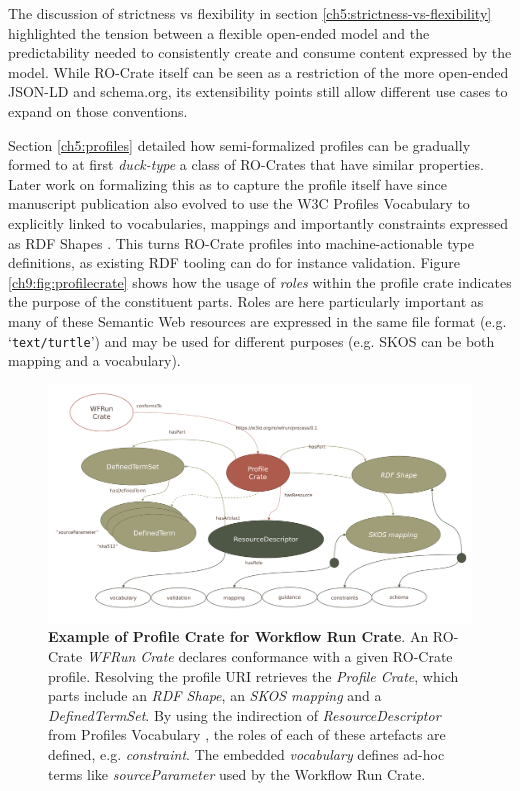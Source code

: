 The discussion of strictness vs flexibility in section \vref{ch5:strictness-vs-flexibility} highlighted the tension between a  flexible open-ended model and the predictability needed to consistently create and consume content expressed by the model. While RO-Crate itself can be seen as a restriction of the more open-ended JSON-LD and schema.org, its extensibility points still allow different use cases to expand on those conventions.  

Section \vref{ch5:profiles} detailed how semi-formalized profiles can be gradually formed to at first \emph{duck-type} a class of RO-Crates that have similar properties. Later work on formalizing this as  to capture the profile itself have since manuscript publication also evolved to use the W3C Profiles Vocabulary \cite{dx-prof} to explicitly linked to vocabularies, mappings and importantly constraints expressed as RDF Shapes \cite{fdo-collections}. This turns RO-Crate profiles into machine-actionable type definitions, as existing RDF tooling can do for instance validation. Figure \vref{ch9:fig:profilecrate} shows how the usage of \emph{roles} within the profile crate indicates the purpose of the constituent parts. Roles are here particularly important as many of these Semantic Web resources are expressed in the same file format (e.g. `\texttt{text/turtle}') and may be used for different purposes (e.g. SKOS \cite{w3-skos-primer} can be both mapping and a vocabulary).

\begin{figure}%
    \includegraphics[width=\textwidth]{figures/ch09/profile-crate.pdf}
      \caption[Example of Profile Crate]{\textbf{Example of Profile Crate for Workflow Run Crate}. 
      An RO-Crate \emph{WFRun Crate} declares conformance with a given RO-Crate profile. Resolving the profile URI retrieves the \emph{Profile Crate}, which parts include an \emph{RDF Shape}, an \emph{SKOS mapping} and a \emph{DefinedTermSet}. 
      By using the indirection of \emph{ResourceDescriptor} from Profiles Vocabulary \cite{dx-prof}, the roles of each of these artefacts are defined, e.g. \emph{constraint}. The embedded \emph{vocabulary} defines ad-hoc terms like \emph{sourceParameter} used by the Workflow Run Crate\footnotemark.
      }
    \label{ch9:fig:profilecrate}
  \end{figure}

